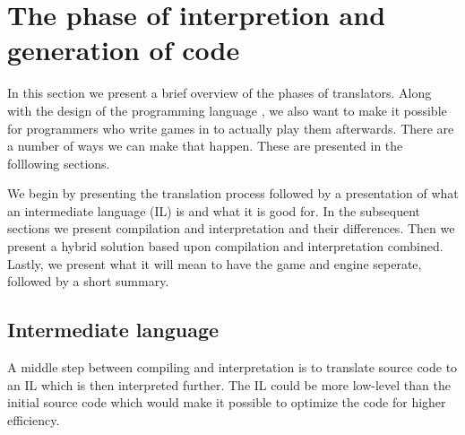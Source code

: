 \section{The phase of interpretion and generation of code}
\label{sec:codegenerationandinterpretation}

In this section we present a brief overview of the phases of translators. Along
with the design of the programming language \productname{}, we also want to make
it possible for programmers who write games in \productname{} to actually play
them afterwards. There are a number of ways we can make that happen. These are
presented in the folllowing sections. 

We begin by presenting the translation process followed by a presentation of
what an intermediate language (IL) is and what it is good for. In the subsequent
sections we present compilation and interpretation and their differences. Then
we present a hybrid solution based upon compilation and interpretation combined.
Lastly, we present what it will mean to have the game and engine seperate,
followed by a short summary.



\subsection{Intermediate language}
\label{sec:intermediatelanguage}
A middle step between compiling and interpretation is to translate source code
to an IL which is then interpreted further. The IL could be more low-level than
the initial source code which would make it possible to optimize the code for
higher efficiency.

